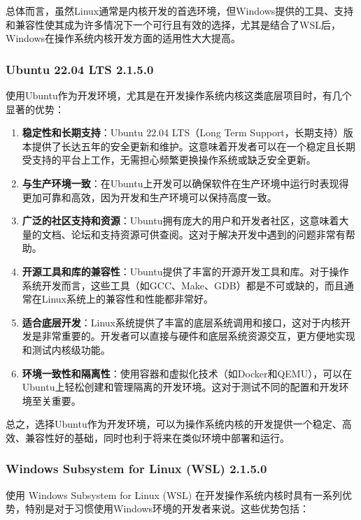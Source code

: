 总体而言，虽然Linux通常是内核开发的首选环境，但Windows提供的工具、支持和兼容性使其成为许多情况下一个可行且有效的选择，尤其是结合了WSL后，Windows在操作系统内核开发方面的适用性大大提高。

\subsubsection{Ubuntu 22.04 LTS 2.1.5.0}

使用Ubuntu作为开发环境，尤其是在开发操作系统内核这类底层项目时，有几个显著的优势：

\begin{enumerate}
    \item \textbf{稳定性和长期支持}：Ubuntu 22.04 LTS（Long Term Support，长期支持）版本提供了长达五年的安全更新和维护。这意味着开发者可以在一个稳定且长期受支持的平台上工作，无需担心频繁更换操作系统或缺乏安全更新。
    \item \textbf{与生产环境一致}：在Ubuntu上开发可以确保软件在生产环境中运行时表现得更加可靠和高效，因为开发和生产环境可以保持高度一致。
    \item \textbf{广泛的社区支持和资源}：Ubuntu拥有庞大的用户和开发者社区，这意味着大量的文档、论坛和支持资源可供查阅。这对于解决开发中遇到的问题非常有帮助。
    \item \textbf{开源工具和库的兼容性}：Ubuntu提供了丰富的开源开发工具和库。对于操作系统开发而言，这些工具（如GCC、Make、GDB）都是不可或缺的，而且通常在Linux系统上的兼容性和性能都非常好。
    \item \textbf{适合底层开发}：Linux系统提供了丰富的底层系统调用和接口，这对于内核开发是非常重要的。开发者可以直接与硬件和底层系统资源交互，更方便地实现和测试内核级功能。
    \item \textbf{环境一致性和隔离性}：使用容器和虚拟化技术（如Docker和QEMU），可以在Ubuntu上轻松创建和管理隔离的开发环境。这对于测试不同的配置和开发环境至关重要。
\end{enumerate}

总之，选择Ubuntu作为开发环境，可以为操作系统内核的开发提供一个稳定、高效、兼容性好的基础，同时也利于将来在类似环境中部署和运行。

\subsubsection{Windows Subsystem for Linux (WSL) 2.1.5.0}

使用 Windows Subsystem for Linux (WSL) 在开发操作系统内核时具有一系列优势，特别是对于习惯使用Windows环境的开发者来说。这些优势包括：

